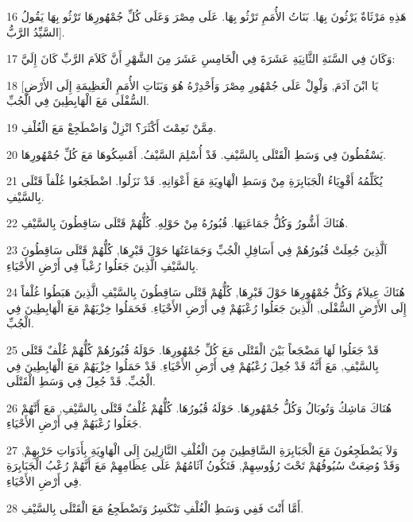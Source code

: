 \par 16 هَذِهِ مَرْثَاةٌ يَرْثُونَ بِهَا. بَنَاتُ الأُمَمِ تَرْثُو بِهَا. عَلَى مِصْرَ وَعَلَى كُلِّ جُمْهُورِهَا تَرْثُو بِهَا يَقُولُ السَّيِّدُ الرَّبُّ].
\par 17 وَكَانَ فِي السَّنَةِ الثَّانِيَةِ عَشَرَةَ فِي الْخَامِسِ عَشَرَ مِنَ الشَّهْرِ أَنَّ كَلاَمَ الرَّبِّ كَانَ إِلَيَّ:
\par 18 [يَا ابْنَ آدَمَ, وَلْوِلْ عَلَى جُمْهُورِ مِصْرَ وَأَحْدِرْهُ هُوَ وَبَنَاتِ الأُمَمِ الْعَظِيمَةِ إِلَى الأَرْضِ السُّفْلَى مَعَ الْهَابِطِينَ فِي الْجُبِّ.
\par 19 مِمَّنْ نَعِمْتَ أَكْثَرَ؟ انْزِلْ وَاضْطَجِعْ مَعَ الْغُلْفِ.
\par 20 يَسْقُطُونَ فِي وَسَطِ الْقَتْلَى بِالسَّيْفِ. قَدْ أُسْلِمَ السَّيْفُ. أَمْسِكُوهَا مَعَ كُلِّ جُمْهُورِهَا.
\par 21 يُكَلِّمُهُ أَقْوِيَاءُ الْجَبَابِرَةِ مِنْ وَسَطِ الْهَاوِيَةِ مَعَ أَعْوَانِهِ. قَدْ نَزَلُوا. اضْطَجَعُوا غُلْفاً قَتْلَى بِالسَّيْفِ.
\par 22 هُنَاكَ أَشُّورُ وَكُلُّ جَمَاعَتِهَا. قُبُورُهُ مِنْ حَوْلِهِ. كُلُّهُمْ قَتْلَى سَاقِطُونَ بِالسَّيْفِ.
\par 23 اَلَّذِينَ جُعِلَتْ قُبُورُهُمْ فِي أَسَافِلِ الْجُبِّ وَجَمَاعَتُهَا حَوْلَ قَبْرِهَا, كُلُّهُمْ قَتْلَى سَاقِطُونَ بِالسَّيْفِ الَّذِينَ جَعَلُوا رُعْباً فِي أَرْضِ الأَحْيَاءِ.
\par 24 هُنَاكَ عِيلاَمُ وَكُلُّ جُمْهُورِهَا حَوْلَ قَبْرِهَا, كُلُّهُمْ قَتْلَى سَاقِطُونَ بِالسَّيْفِ الَّذِينَ هَبَطُوا غُلْفاً إِلَى الأَرْضِ السُّفْلَى, الَّذِينَ جَعَلُوا رُعْبَهُمْ فِي أَرْضِ الأَحْيَاءِ. فَحَمَلُوا خِزْيَهُمْ مَعَ الْهَابِطِينَ فِي الْجُبِّ.
\par 25 قَدْ جَعَلُوا لَهَا مَضْجَعاً بَيْنَ الْقَتْلَى مَعَ كُلِّ جُمْهُورِهَا. حَوْلَهُ قُبُورُهُمْ كُلُّهُمْ غُلْفٌ قَتْلَى بِالسَّيْفِ, مَعَ أَنَّهُ قَدْ جُعِلَ رُعْبُهُمْ فِي أَرْضِ الأَحْيَاءِ. قَدْ حَمَلُوا خِزْيَهُمْ مَعَ الْهَابِطِينَ فِي الْجُبِّ. قَدْ جُعِلَ فِي وَسَطِ الْقَتْلَى.
\par 26 هُنَاكَ مَاشِكُ وَتُوبَالُ وَكُلُّ جُمْهُورِهَا. حَوْلَهُ قُبُورُهَا. كُلُّهُمْ غُلْفٌ قَتْلَى بِالسَّيْفِ, مَعَ أَنَّهُمْ جَعَلُوا رُعْبَهُمْ فِي أَرْضِ الأَحْيَاءِ.
\par 27 وَلاَ يَضْطَجِعُونَ مَعَ الْجَبَابِرَةِ السَّاقِطِينَ مِنَ الْغُلْفِ النَّازِلِينَ إِلَى الْهَاوِيَةِ بِأَدَوَاتِ حَرْبِهِمْ, وَقَدْ وُضِعَتْ سُيُوفُهُمْ تَحْتَ رُؤُوسِهِمْ, فَتَكُونُ آثَامُهُمْ عَلَى عِظَامِهِمْ مَعَ أَنَّهُمْ رُعْبُ الْجَبَابِرَةِ فِي أَرْضِ الأَحْيَاءِ.
\par 28 أَمَّا أَنْتَ فَفِي وَسَطِ الْغُلْفِ تَنْكَسِرُ وَتَضْطَجِعُ مَعَ الْقَتْلَى بِالسَّيْفِ.
